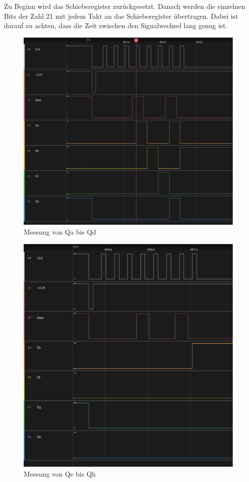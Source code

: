 \documentclass{article}
\begin{document}
    Zu Beginn wird das Schieberegister zurückgesetzt.
    Danach werden die einzelnen Bits der Zahl 21 mit jedem Takt an das Schieberegister übertragen.
    Dabei ist darauf zu achten, dass die Zeit zwischen den Signalwechsel lang genug ist. \\

    

    \begin{figure}[h]
        \centering
        \includegraphics[width=\linewidth]{../measurement1.png}
        \caption{Messung von Qa bis Qd}
    \end{figure}

    \begin{figure}
        \centering
        \includegraphics[width=\linewidth]{../measurement2.png}
        \caption{Messung von Qe bis Qh}
    \end{figure}
\end{document}
